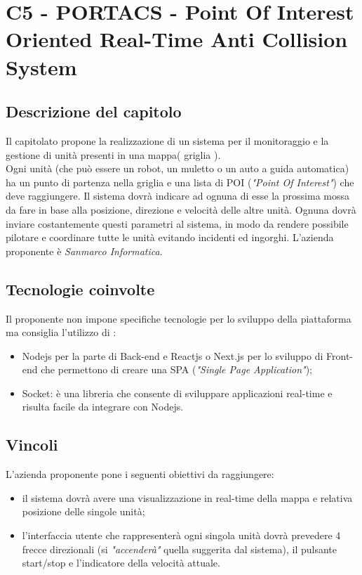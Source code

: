 \section{C5 - PORTACS - Point Of Interest  Oriented Real-Time Anti Collision System}

\subsection{Descrizione del capitolo}
Il capitolato propone la realizzazione di un sistema per il monitoraggio e la gestione di unità presenti in una mappa( griglia ).\\
Ogni unità (che può essere un robot, un muletto o un auto a guida automatica) ha un punto di partenza nella griglia e una lista di POI (\textit{"Point Of Interest"})  che deve raggiungere.
Il sistema dovrà indicare ad ognuna di esse la prossima mossa da fare in base alla posizione, direzione e velocità  delle altre unità. Ognuna dovrà inviare costantemente questi parametri al sistema, in modo da rendere possibile pilotare e coordinare tutte le unità evitando incidenti ed ingorghi.
L'azienda proponente è \textit{Sanmarco Informatica}.

\subsection{Tecnologie coinvolte}
Il proponente non impone specifiche tecnologie per lo sviluppo della piattaforma ma consiglia l'utilizzo di :
\begin{itemize}
\item Nodejs per la parte di Back-end e Reactjs o Next.js  per lo sviluppo di Front-end che permettono di creare una SPA (\textit{"Single Page Application"});
\item Socket: è una libreria che consente di sviluppare applicazioni real-time e risulta facile da integrare con Nodejs.
\end{itemize}

\subsection{Vincoli}
L'azienda proponente pone i seguenti obiettivi da raggiungere:

\begin{itemize}
\item il sistema dovrà avere una visualizzazione in real-time della mappa e relativa posizione delle singole unità;
\item l'interfaccia utente che rappresenterà ogni singola unità  dovrà prevedere 4 frecce direzionali (si \textit{"accenderà"} quella suggerita dal sistema), il pulsante start/stop e l'indicatore della velocità attuale.
\end{itemize}

